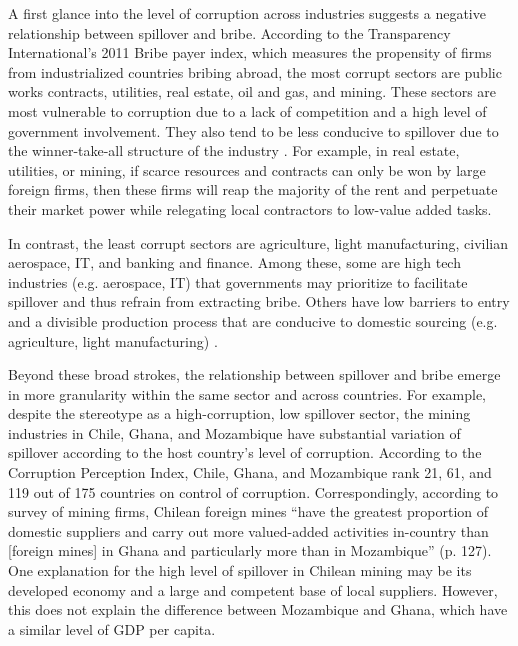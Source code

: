 A first glance into the level of corruption across industries suggests a negative relationship between spillover and bribe. According to the Transparency International's 2011 Bribe payer index, which measures the propensity of firms from industrialized countries bribing abroad, the most corrupt sectors are public works contracts, utilities, real estate, oil and gas, and mining. These sectors are most vulnerable to corruption due to a lack of competition and a high level of government involvement. They also tend to be less conducive to spillover due to the winner-take-all structure of the industry \citep[138]{UNCTAD2011}. For example, in real estate, utilities, or mining, if scarce resources and contracts can only be won by large foreign firms, then these firms will reap the majority of the rent and perpetuate their market power while relegating local contractors to low-value added tasks.

In contrast, the least corrupt sectors are agriculture, light manufacturing, civilian aerospace, IT, and banking and finance. Among these, some are high tech industries (e.g. aerospace, IT) that governments may prioritize to facilitate spillover and thus refrain from extracting bribe. Others have low barriers to entry and a divisible production process that are conducive to domestic sourcing (e.g. agriculture, light manufacturing) \citep{TransparencyInternational2011}.

Beyond these broad strokes, the relationship between spillover and bribe emerge in more granularity within the same sector and across countries. For example, despite the stereotype as a high-corruption, low spillover sector, the mining industries in Chile, Ghana, and Mozambique have substantial variation of spillover according to the host country's level of corruption. According to the Corruption Perception Index, Chile, Ghana, and Mozambique rank 21, 61, and 119 out of 175 countries on control of corruption. Correspondingly, according to survey of mining firms, Chilean foreign mines ``have the greatest proportion of domestic suppliers and carry out more valued-added activities in-country than [foreign mines] in Ghana and particularly more than in Mozambique'' (p. 127). One explanation for the high level of spillover in Chilean mining may be its developed economy and a large and competent base of local suppliers. However, this does not explain the difference between Mozambique and Ghana, which have a similar level of GDP per capita.

